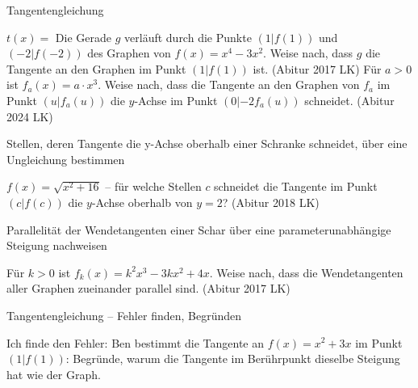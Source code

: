 \begin{aufgabe}{Tangentengleichung}
\begin{teile}
\begin{ksys}[xmin=-2,xmax=6,ymin=-5,ymax=6,ablesen]   \end{ksys}
$t(x) =$ \leerfeld
\teil Die Gerade $g$ verläuft durch die Punkte $(1 | f(1))$ und $(-2 | f(-2))$ des Graphen von $f(x) = x^4 - 3x^2$. Weise nach, dass $g$ die Tangente an den Graphen im Punkt $(1 | f(1))$ ist. \hfill (Abitur 2017 LK)
\teil Für $a > 0$ ist $f_a(x) = a \cdot x^3$. Weise nach, dass die Tangente an den Graphen von $f_a$ im Punkt $(u | f_a(u))$ die $y$-Achse im Punkt $(0 | -2f_a(u))$ schneidet. \hfill (Abitur 2024 LK)
\end{teile}
\end{aufgabe}

\begin{aufgabe}{Stellen, deren Tangente die y-Achse oberhalb einer Schranke schneidet, über eine Ungleichung bestimmen}
\begin{teile}
\teil $f(x) = \sqrt{x^2 + 16}$ – für welche Stellen $c$ schneidet die Tangente im Punkt $(c | f(c))$ die $y$-Achse oberhalb von $y = 2$? \hfill (Abitur 2018 LK) \\ \leerfeld
\end{teile}
\end{aufgabe}

\begin{aufgabe}{Parallelität der Wendetangenten einer Schar über eine parameterunabhängige Steigung nachweisen}
\begin{teile}
\teil Für $k > 0$ ist $f_k(x) = k^2x^3 - 3kx^2 + 4x$. Weise nach, dass die Wendetangenten aller Graphen zueinander parallel sind. \hfill (Abitur 2017 LK)
\end{teile}
\end{aufgabe}

\begin{aufgabe}{Tangentengleichung – Fehler finden, Begründen}
\begin{teile}
\teil Ich finde den Fehler: Ben bestimmt die Tangente an $f(x) = x^2 + 3x$ im Punkt $(1 | f(1))$: 
\teil Begründe, warum die Tangente im Berührpunkt dieselbe Steigung hat wie der Graph.
\end{teile}
\end{aufgabe}
